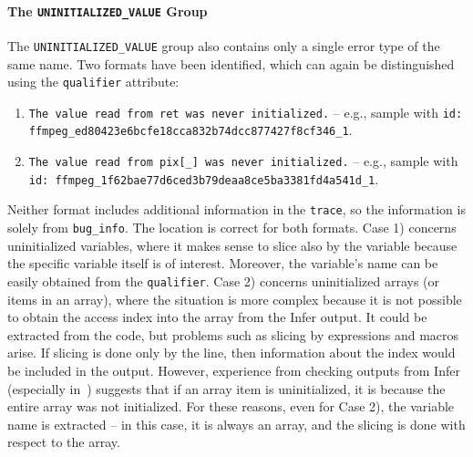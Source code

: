 \paragraph{The \texttt{UNINITIALIZED\_VALUE} Group}
The \texttt{UNINITIALIZED\_VALUE} group also contains only a single error type of the same name. Two formats have been identified, which can again be distinguished using the \texttt{qualifier} attribute:
\begin{enumerate}
    \item \texttt{The value read from ret was never initialized.} 
    \newline
    -- e.g., sample with \texttt{id: ffmpeg\_ed80423e6bcfe18cca832b74dcc877427f8cf346\_1}.
    \item \texttt{The value read from pix[\_] was never initialized.}
    \newline
    -- e.g., sample with \texttt{id: ffmpeg\_1f62bae77d6ced3b79deaa8ce5ba3381fd4a541d\_1}.
\end{enumerate}
Neither format includes additional information in the \texttt{trace}, so the information is solely from \texttt{bug\_info}. The location is correct for both formats. Case 1) concerns uninitialized variables, where it makes sense to slice also by the variable because the specific variable itself is of interest. Moreover, the variable's name can be easily obtained from the \texttt{qualifier}. Case 2) concerns uninitialized arrays (or items in an array), where the situation is more complex because it is not possible to obtain the access index into the array from the Infer output. It could be extracted from the code, but problems such as slicing by expressions and macros arise. If slicing is done only by the line, then information about the index would be included in the output. However, experience from checking outputs from Infer (especially in~\cite{bc}) suggests that if an array item is uninitialized, it is because the entire array was not initialized. For these reasons, even for Case 2), the variable name is extracted -- in this case, it is always an array, and the slicing is done with respect to the array.

